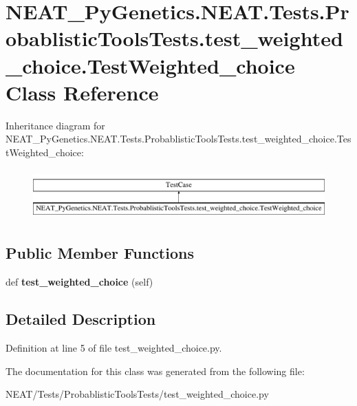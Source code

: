 \hypertarget{class_n_e_a_t___py_genetics_1_1_n_e_a_t_1_1_tests_1_1_probablistic_tools_tests_1_1test__weightedcb7f00d1e1eae60daa5b61a772f3f84f}{}\section{N\+E\+A\+T\+\_\+\+Py\+Genetics.\+N\+E\+A\+T.\+Tests.\+Probablistic\+Tools\+Tests.\+test\+\_\+weighted\+\_\+choice.\+Test\+Weighted\+\_\+choice Class Reference}
\label{class_n_e_a_t___py_genetics_1_1_n_e_a_t_1_1_tests_1_1_probablistic_tools_tests_1_1test__weightedcb7f00d1e1eae60daa5b61a772f3f84f}
Inheritance diagram for N\+E\+A\+T\+\_\+\+Py\+Genetics.\+N\+E\+A\+T.\+Tests.\+Probablistic\+Tools\+Tests.\+test\+\_\+weighted\+\_\+choice.\+Test\+Weighted\+\_\+choice\+:\begin{figure}[H]
\begin{center}
\leavevmode
\includegraphics[height=1.958042cm]{class_n_e_a_t___py_genetics_1_1_n_e_a_t_1_1_tests_1_1_probablistic_tools_tests_1_1test__weightedcb7f00d1e1eae60daa5b61a772f3f84f}
\end{center}
\end{figure}
\subsection*{Public Member Functions}
\begin{DoxyCompactItemize}
\item 
def {\bfseries test\+\_\+weighted\+\_\+choice} (self)\hypertarget{class_n_e_a_t___py_genetics_1_1_n_e_a_t_1_1_tests_1_1_probablistic_tools_tests_1_1test__weightedcb7f00d1e1eae60daa5b61a772f3f84f_a4b5c0062155a42666019e95b2d3d82f1}{}\label{class_n_e_a_t___py_genetics_1_1_n_e_a_t_1_1_tests_1_1_probablistic_tools_tests_1_1test__weightedcb7f00d1e1eae60daa5b61a772f3f84f_a4b5c0062155a42666019e95b2d3d82f1}

\end{DoxyCompactItemize}


\subsection{Detailed Description}


Definition at line 5 of file test\+\_\+weighted\+\_\+choice.\+py.



The documentation for this class was generated from the following file\+:\begin{DoxyCompactItemize}
\item 
N\+E\+A\+T/\+Tests/\+Probablistic\+Tools\+Tests/test\+\_\+weighted\+\_\+choice.\+py\end{DoxyCompactItemize}
